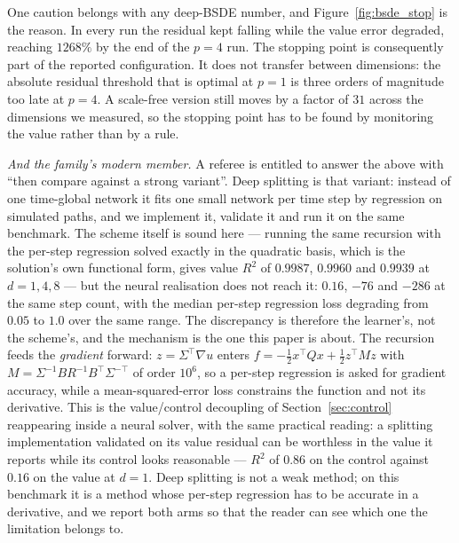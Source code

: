 \documentclass[conference]{IEEEtran}
\begin{document}
One caution belongs with any deep-BSDE number, and Figure~\ref{fig:bsde_stop} is the reason. In every
run the residual kept falling while the value error degraded, reaching $1268\%$ by the end of the
$p=4$ run. The stopping point is consequently part of the reported configuration. It does not
transfer between dimensions: the absolute residual threshold that is optimal at $p=1$ is three orders
of magnitude too late at $p=4$. A scale-free version still moves by a factor of $31$ across the
dimensions we measured, so the stopping point has to be found by monitoring the value rather than by
a rule.

\emph{And the family's modern member.} A referee is entitled to answer the above with ``then compare
against a strong variant''. Deep splitting \cite{beck2019deep} is that variant: instead of one
time-global network it fits one small network per time step by regression on simulated paths, and we
implement it, validate it and run it on the same benchmark. The scheme itself is sound here --- running
the same recursion with the per-step regression solved exactly in the quadratic basis, which is the
solution's own functional form, gives value $R^2$ of $0.9987$, $0.9960$ and $0.9939$ at $d = 1, 4, 8$
--- but the neural realisation does not reach it: $0.16$, $-76$ and $-286$ at the same step count, with
the median per-step regression loss degrading from $0.05$ to $1.0$ over the same range. The
discrepancy is therefore the learner's, not the scheme's, and the mechanism is the one this paper is
about. The recursion feeds the \emph{gradient} forward: $z = \Sigma^\top\nabla u$ enters
$f = -\tfrac12 x^\top Qx + \tfrac12 z^\top M z$ with $M = \Sigma^{-1}BR^{-1}B^\top\Sigma^{-\top}$
of order $10^6$, so a per-step regression is asked for gradient accuracy, while a mean-squared-error
loss constrains the function and not its derivative. This is the value/control decoupling of
Section~\ref{sec:control} reappearing inside a neural solver, with the same practical reading: a
splitting implementation validated on its value residual can be worthless in the value it reports
while its control looks reasonable --- $R^2$ of $0.86$ on the control against $0.16$ on the value at
$d=1$. Deep splitting is not a weak method; on this benchmark it is a method whose per-step regression
has to be accurate in a derivative, and we report both arms so that the reader can see which one the
limitation belongs to.
\end{document}
